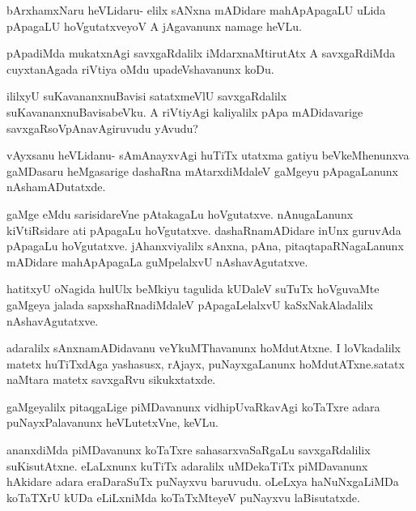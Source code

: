 \documentclass{article}
\begin{document}
\begin{mng}%
bArxhamxNaru heVLidaru- elilx sANxna mADidare mahApApagaLU uLida pApagaLU hoVgutatxveyoV A jAgavanunx namage heVLu.
\end{mng}

\begin{mng}%
pApadiMda mukatxnAgi savxgaRdalilx iMdarxnaMtirutAtx A savxgaRdiMda cuyxtanAgada riVtiya oMdu upadeVshavanunx koDu.
\end{mng}

\begin{mng}%
ililxyU suKavananxnuBavisi satatxmeVlU savxgaRdalilx suKavananxnuBavisabeVku. A riVtiyAgi kaliyalilx pApa mADidavarige savxgaRsoVpAnavAgiruvudu yAvudu?
\end{mng}

\begin{mng}%
vAyxsanu heVLidanu- sAmAnayxvAgi huTiTx utatxma gatiyu beVkeMhenunxva gaMDasaru heMgasarige dashaRna mAtarxdiMdaleV gaMgeyu pApagaLanunx nAshamADutatxde.
\end{mng}

\begin{mng}%
gaMge eMdu sarisidareVne pAtakagaLu hoVgutatxve. nAnugaLanunx kiVtiRsidare ati pApagaLu hoVgutatxve. dashaRnamADidare inUnx guruvAda pApagaLu hoVgutatxve. jAhanxviyalilx sAnxna, pAna, pitaqtapaRNagaLanunx mADidare mahApApagaLa guMpelalxvU nAshavAgutatxve.
\end{mng}

\begin{mng}%
hatitxyU oNagida hulUlx beMkiyu tagulida kUDaleV suTuTx hoVguvaMte gaMgeya jalada sapxshaRnadiMdaleV pApagaLelalxvU kaSxNakAladalilx nAshavAgutatxve.
\end{mng}

\begin{mng}%
adaralilx sAnxnamADidavanu veYkuMThavanunx hoMdutAtxne. I loVkadalilx matetx huTiTxdAga yashasusx, rAjayx, puNayxgaLanunx hoMdutATxne.satatx naMtara matetx savxgaRvu sikukxtatxde.
\end{mng}

\begin{mng}%
gaMgeyalilx pitaqgaLige piMDavanunx vidhipUvaRkavAgi koTaTxre adara puNayxPalavanunx heVLutetxVne, keVLu.
\end{mng}

\begin{mng}%
ananxdiMda piMDavanunx koTaTxre sahasarxvaSaRgaLu savxgaRdalilix suKisutAtxne. eLaLxnunx kuTiTx adaralilx uMDekaTiTx piMDavanunx hAkidare adara eraDaraSuTx puNayxvu baruvudu. oLeLxya haNuNxgaLiMDa koTaTXrU kUDa eLiLxniMda koTaTxMteyeV puNayxvu laBisutatxde.
\end{mng}
\end{document}
